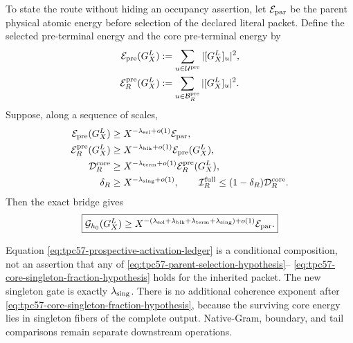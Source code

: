 To state the route without hiding an occupancy assertion, let
\(\mathcal E_{\rm par}\) be the parent physical atomic energy before selection of
the declared literal packet.  Define the selected pre-terminal energy and
the core pre-terminal energy by
\begin{align}
 \mathcal E_{\rm pre}(G_X^L)
 &:=\sum_{u\in\mathcal U^{\rm pre}}|[G_X^L]_u|^2,
 \label{eq:tpc57-selected-preterminal-energy}\\
 \mathcal E_R^{\rm pre}(G_X^L)
 &:=\sum_{u\in\mathcal B_R^{\rm pre}}|[G_X^L]_u|^2.
 \label{eq:tpc57-core-preterminal-energy}
\end{align}
Suppose, along a sequence of scales,
\begin{align}
 \mathcal E_{\rm pre}(G_X^L)
 &\ge X^{-\lambda_{\rm sel}+o(1)}\mathcal E_{\rm par},
 \label{eq:tpc57-parent-selection-hypothesis}\\
 \mathcal E_R^{\rm pre}(G_X^L)
 &\ge X^{-\lambda_{\rm blk}+o(1)}
       \mathcal E_{\rm pre}(G_X^L),
 \label{eq:tpc57-core-block-occupancy-hypothesis}\\
 \mathcal D_R^{\rm core}
 &\ge X^{-\lambda_{\rm term}+o(1)}
       \mathcal E_R^{\rm pre}(G_X^L),
 \label{eq:tpc57-core-terminal-activation-hypothesis}\\
 \delta_R
 &\ge X^{-\lambda_{\rm sing}+o(1)},
 \qquad
 \mathcal I_R^{\rm full}\le(1-\delta_R)\mathcal D_R^{\rm core}.
 \label{eq:tpc57-core-singleton-fraction-hypothesis}
\end{align}
Then the exact bridge gives
\begin{equation}
 \boxed{
 \mathcal G_{h_0}(G_X^L)
 \ge
 X^{-(\lambda_{\rm sel}+\lambda_{\rm blk}
       +\lambda_{\rm term}+\lambda_{\rm sing})+o(1)}
 \mathcal E_{\rm par}.}
 \label{eq:tpc57-prospective-activation-ledger}
\end{equation}

Equation \eqref{eq:tpc57-prospective-activation-ledger} is a conditional
composition, not an assertion that any of
\eqref{eq:tpc57-parent-selection-hypothesis}--
\eqref{eq:tpc57-core-singleton-fraction-hypothesis} holds for the inherited
packet.  The new singleton gate is exactly
\(\lambda_{\rm sing}\).  There is no additional coherence exponent after
\eqref{eq:tpc57-core-singleton-fraction-hypothesis}, because the surviving
core energy lies in singleton fibers of the complete output.  Native-Gram,
boundary, and tail comparisons remain separate downstream operations.
